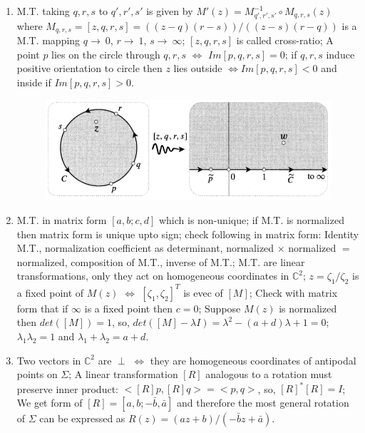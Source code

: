 \documentclass[12pt]{article}
\newcommand{\C}{\mathbb{C}}
\newcommand{\rto}{\rightarrow\ }
\begin{document}
\begin{enumerate}
    \item M.T. taking $q,r,s$ to $q',r',s'$ is given by $M'(z) = M^{-1}_{q',r',s'} \circ M_{q,r,s} (z)$ where $M_{q,r,s} = [z,q,r,s] = ((z-q)(r-s))/((z-s)(r-q))$ is a M.T. mapping $q\rto 0$, $r \rto 1$, $s \rto \infty$; $[z,q,r,s]$ is called cross-ratio; A point $p$ lies on the circle through $q,r,s$ $\iff$ $Im[p,q,r,s] = 0$; if $q,r,s$ induce positive orientation to circle then $z$ lies outside $\iff Im[p,q,r,s] < 0$ and inside if $Im[p,q,r,s] > 0$.

    \begin{figure}[h!]
        \centering
        \includegraphics[scale=0.7]{fig_19}
        \label{f19}
    \end{figure}

    \item M.T. in matrix form $[a,b; c,d]$ which is non-unique; if M.T. is normalized then matrix form is unique upto sign; check following in matrix form: Identity M.T., normalization coefficient as determinant, normalized $\times$ normalized $=$ normalized, composition of M.T., inverse of M.T.; M.T. are linear transformations, only they act on homogeneous coordinates in $\C^2$; $z = \zeta_1/\zeta_2$ is a fixed point of $M(z)$ $\iff$ $[\zeta_1,\zeta_2]^T$ is evec of $[M]$; Check with matrix form that if $\infty$ is a fixed point then $c = 0$; Suppose $M(z)$ is normalized then $det([M]) = 1$, so, $det([M]-\lambda I) = \lambda^2-(a+d)\lambda+1=0$; $\lambda_1\lambda_2=1$ and $\lambda_1+\lambda_2=a+d$.
    
    \item Two vectors in $\C^2$ are $\perp$ $\iff$ they are homogeneous coordinates of antipodal points on $\Sigma$; A linear transformation $[R]$ analogous to a rotation must preserve inner product: $<[R]p,[R]q> = <p, q>$, so, $[R]^{*}[R] = I$; We get form of $[R] = [a, b; -\bar{b}, \bar{a}]$ and therefore the most general rotation of $\Sigma$ can be expressed as $R(z) = (az+b)/(-\bar{b}z+\bar{a})$.
    

\end{enumerate}
\end{document}
